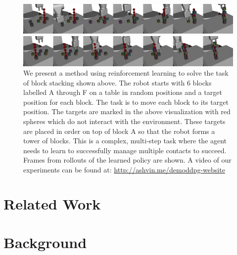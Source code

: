 \begin{figure}[t]
    \vspace{6pt}
    \centering
    \includegraphics[width=1.0\linewidth]{bcddpg/figs/combined1}
    
    \vspace{0.1cm}
    
    \includegraphics[width=1.0\linewidth]{bcddpg/figs/combined2}
    \caption{We present a method using reinforcement learning to solve the task of block stacking shown above. The robot starts with 6 blocks labelled A through F on a table in random positions and a target position for each block. The task is to move each block to its target position. The targets are marked in the above visualization with red spheres which do not interact with the environment. These targets are placed in order on top of block A so that the robot forms a tower of blocks. This is a complex, multi-step task where the agent needs to learn to successfully manage multiple contacts to succeed. Frames from rollouts of the learned policy are shown. A video of our experiments can be found at:  \url{http://ashvin.me/demoddpg-website} }%
    \vspace{-3pt}
    \label{fig:fig1}
\end{figure}

\section{Related Work}



\section{Background}



